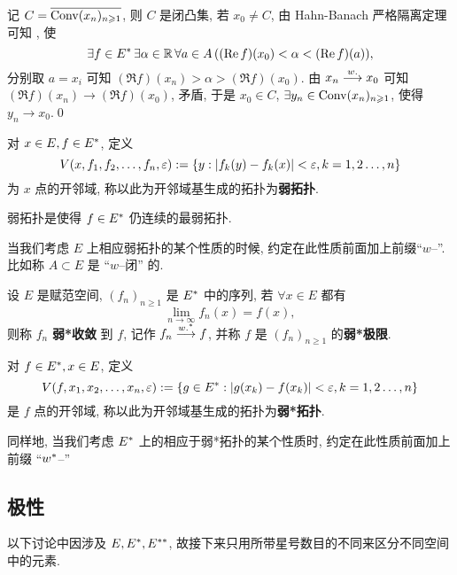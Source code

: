 	\begin{Proof}
		记 $ C = \overline{\operatorname{Conv}(x_{n})_{n\geqslant1}} $, 则 $ C $ 是闭凸集, 若 $ x_{0}\ne C $, 由 Hahn-Banach 严格隔离定理可知 $  $, 使
		\[
			\exists f\in E^{*}\,\exists\alpha\in\mathbb{R}\,\forall a\in A\,((\mathrm{Re\,} f)(x_{0})<\alpha<(\mathrm{Re\,} f)(a)),
		\]
		分别取 $ a=x_{i} $ 可知 $ (\Re f)(x_{n})>\alpha>(\Re f)(x_{0}) $. 由 $ x_{n}\overset{w.}{\longrightarrow} x_{0} $ 可知 $ (\Re f)(x_{n})\to (\Re f)(x_{0}) $, 矛盾, 于是 $ x_{0}\in C $, $ \exists y_{n}\in\operatorname{Conv}(x_{n})_{n\geqslant1} $, 使得 $ y_{n}\to x_{0} $.\qed
	\end{Proof}
	\begin{Definition}[弱拓扑]\label{def:弱拓扑}
		对 $ x\in E, f\in E^{*} $, 定义
		\[
			V(x, f_{1}, f_{2}, \dots, f_{n}, \varepsilon):=\{ y:\left| f_{k}(y)-f_{k}(x) \right| <\varepsilon, k=1, 2\dots, n \}
		\]
		为 $ x $ 点的开邻域, 称以此为开邻域基生成的拓扑为\textbf{弱拓扑}.
	\end{Definition}
	\begin{Remark}
		弱拓扑是使得 $ f\in E^{*} $ 仍连续的最弱拓扑.
	\end{Remark}
	\begin{Remark}
		当我们考虑 $ E $ 上相应弱拓扑的某个性质的时候, 约定在此性质前面加上前缀``$ w $--''. 比如称 $ A\subset E $ 是 ``$ w $--闭'' 的.
	\end{Remark}

	\begin{Definition}[弱*收敛]\label{def:弱*收敛}
		设 $ E $ 是赋范空间, $ (f_{n})_{n\geqslant1} $ 是 $ E^{*} $ 中的序列, 若 $ \forall x\in E $ 都有
		\[
			\lim_{n\to\infty}f_{n}(x)=f(x),
		\]
		则称 $ f_{n} $ \textbf{弱*收敛} 到 $ f $, 记作 $ f_{n}\overset{w.^{*}}{\longrightarrow} f $, 并称 $ f $ 是 $ (f_{n})_{n\geqslant1} $ 的\textbf{弱*极限}.
	\end{Definition}
	\begin{Definition}[弱*拓扑]\label{def:弱*拓扑}
		对 $ f\in E^{*}, x\in E $, 定义
		\[
			V(f, x_{1}, x_{2}, \dots, x_{n}, \varepsilon):=\{ g\in E^{*}:\left| g(x_{k})-f(x_{k}) \right| <\varepsilon, k=1, 2\dots, n \}
		\]
		是 $ f $ 点的开邻域, 称以此为开邻域基生成的拓扑为\textbf{弱*拓扑}.
	\end{Definition}
	\begin{Remark}
		同样地, 当我们考虑 $ E^{*} $ 上的相应于弱*拓扑的某个性质时, 约定在此性质前面加上前缀 ``$w^{*}$--''
	\end{Remark}


\subsection{极性}
	以下讨论中因涉及 $ E, E^{*}, E^{**} $, 故接下来只用所带星号数目的不同来区分不同空间中的元素.
	
